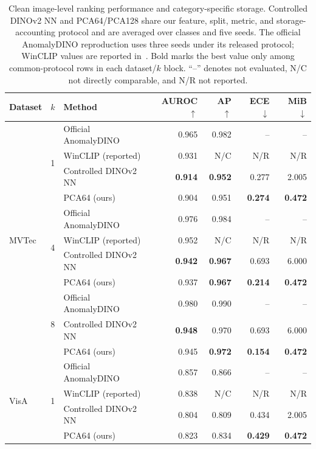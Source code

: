 \begin{table}[pos=t]
\centering
\caption{Clean image-level ranking performance and category-specific storage. Controlled DINOv2 NN and PCA64/PCA128 share our feature, split, metric, and storage-accounting protocol and are averaged over classes and five seeds. The official AnomalyDINO reproduction uses three seeds under its released protocol; WinCLIP values are reported in~\cite{winclip2023}. Bold marks the best value only among common-protocol rows in each dataset/$k$ block. ``--'' denotes not evaluated, N/C not directly comparable, and N/R not reported.}
\label{tab:clean-efficiency}
\setlength{\tabcolsep}{2.4pt}
\footnotesize
\begin{tabular}{ll lrrrr}
\toprule
Dataset & $k$ & Method & AUROC $\uparrow$ & AP $\uparrow$ & ECE $\downarrow$ & MiB $\downarrow$ \\
\midrule
\multirow{11}{*}{MVTec}
& \multirow{4}{*}{1} & Official AnomalyDINO & 0.965 & 0.982 & -- & -- \\
& & WinCLIP (reported) & 0.931 & N/C & N/R & N/R \\
& & Controlled DINOv2 NN & \textbf{0.914} & \textbf{0.952} & 0.277 & 2.005 \\
& & PCA64 (ours) & 0.904 & 0.951 & \textbf{0.274} & \textbf{0.472} \\
\cmidrule(lr){2-7}
& \multirow{4}{*}{4} & Official AnomalyDINO & 0.976 & 0.984 & -- & -- \\
& & WinCLIP (reported) & 0.952 & N/C & N/R & N/R \\
& & Controlled DINOv2 NN & \textbf{0.942} & \textbf{0.967} & 0.693 & 6.000 \\
& & PCA64 (ours) & 0.937 & \textbf{0.967} & \textbf{0.214} & \textbf{0.472} \\
\cmidrule(lr){2-7}
& \multirow{3}{*}{8} & Official AnomalyDINO & 0.980 & 0.990 & -- & -- \\
& & Controlled DINOv2 NN & \textbf{0.948} & 0.970 & 0.693 & 6.000 \\
& & PCA64 (ours) & 0.945 & \textbf{0.972} & \textbf{0.154} & \textbf{0.472} \\
\midrule
\multirow{14}{*}{VisA}
& \multirow{5}{*}{1} & Official AnomalyDINO & 0.857 & 0.866 & -- & -- \\
& & WinCLIP (reported) & 0.838 & N/C & N/R & N/R \\
& & Controlled DINOv2 NN & 0.804 & 0.809 & 0.434 & 2.005 \\
& & PCA64 (ours) & 0.823 & 0.834 & \textbf{0.429} & \textbf{0.472} \\

\end{tabular}
\end{table}
